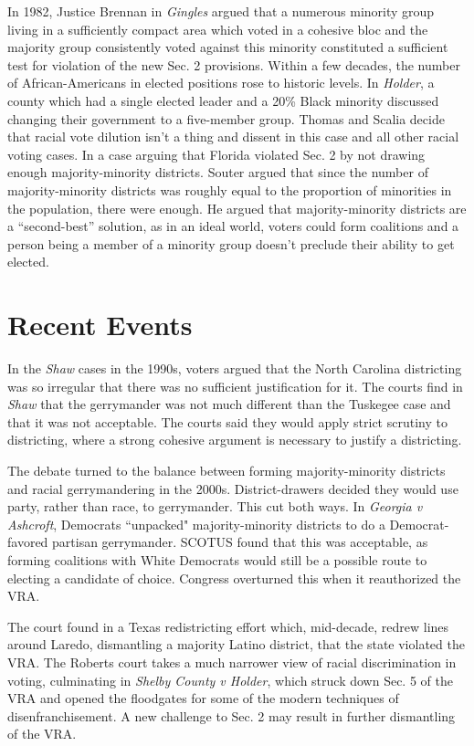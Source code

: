 In 1982, Justice Brennan in \textit{Gingles} argued that a numerous minority group living in a sufficiently compact area which voted in a cohesive bloc and the majority group consistently voted against this minority constituted a sufficient test for violation of the new Sec. 2 provisions.  Within a few decades, the number of African-Americans in elected positions rose to historic levels.  In \textit{Holder}, a county which had a single elected leader and a 20\% Black minority discussed changing their government to a five-member group.  Thomas and Scalia decide that racial vote dilution isn't a thing and dissent in this case and all other racial voting cases.  In a case arguing that Florida violated Sec. 2 by not drawing enough majority-minority districts.  Souter argued that since the number of majority-minority districts was roughly equal to the proportion of minorities in the population, there were enough. He argued that majority-minority districts are a ``second-best'' solution, as in an ideal world, voters could form coalitions and a person being a member of a minority group doesn't preclude their ability to get elected.

\section*{Recent Events}

In the \textit{Shaw} cases in the 1990s, voters argued that the North Carolina districting was so irregular that there was no sufficient justification for it.  The courts find in \textit{Shaw} that the gerrymander was not much different than the Tuskegee case and that it was not acceptable.  The courts said they would apply strict scrutiny to districting, where a strong cohesive argument is necessary to justify a districting.  

The debate turned to the balance between forming majority-minority districts and racial gerrymandering in the 2000s.  District-drawers decided they would use party, rather than race, to gerrymander.  This cut both ways.  In \textit{Georgia v Ashcroft}, Democrats ``unpacked" majority-minority districts to do a Democrat-favored partisan gerrymander.  SCOTUS found that this was acceptable, as forming coalitions with White Democrats would still be a possible route to electing a candidate of choice.  Congress overturned this when it reauthorized the VRA.

The court found in a Texas redistricting effort which, mid-decade, redrew lines around Laredo, dismantling a majority Latino district, that the state violated the VRA.  The Roberts court takes a much narrower view of racial discrimination in voting, culminating in \textit{Shelby County v Holder}, which struck down Sec. 5 of the VRA and opened the floodgates for some of the modern techniques of disenfranchisement. A new challenge to Sec. 2 may result in further dismantling of the VRA.
